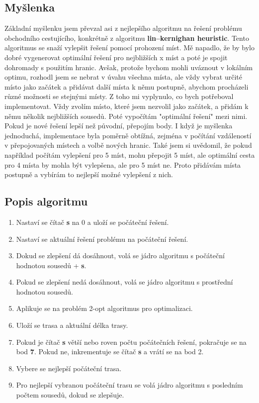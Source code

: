 \subsection{Myšlenka}
Základní myšlenku jsem převzal asi z nejlepšího algoritmu na řešení problému obchodního cestujícího, konkrétně z algoritmu \textbf{lin–kernighan heuristic}. Tento algoritmus se snaží vylepšit řešení pomocí prohození míst. Mě napadlo, že by bylo dobré vygenerovat optimální řešení pro nejbližších x míst a poté je spojit dohromady s použitím hranic. Avšak, protože bychom mohli uváznout v lokálním optimu, rozhodl jsem se nebrat v úvahu všechna místa, ale vždy vybrat určité místo jako začátek a přidávat další místa k němu postupně, abychom procházeli různé možnosti se stejnými místy. Z toho mi vyplynulo, co bych potřeboval implementovat. Vždy zvolím místo, které jsem nezvolil jako začátek, a přidám k němu několik nejbližších sousedů. Poté vypočítám "optimální řešení" mezi nimi. Pokud je nové řešení lepší než původní, přepojím body. I když je myšlenka jednoduchá, implementace byla poměrně obtížná, zejména v počítání vzdáleností v přepojovaných místech a volbě nových hranic. Také jsem si uvědomil, že pokud například počítám vylepšení pro 5 míst, mohu přepojit 5 míst, ale optimální cesta pro 4 místa by mohla být vylepšena, ale pro 5 míst ne. Proto přidávám místa postupně a vybírám to nejlepší možné vylepšení z nich.

\subsection{Popis algoritmu}
\begin{enumerate}
\item Nastaví se čítač \textbf{s} na 0 a uloží se počáteční řešení.
\item Nastaví se aktuální řešení problému na počáteční řešení.
\item Dokud se zlepšení dá dosáhnout, volá se jádro algoritmu s počáteční hodnotou sousedů + \textbf{s}.
\item Pokud se zlepšení nedá dosáhnout, volá se jádro algoritmu s prostřední hodnotou sousedů.
\item Aplikuje se na problém 2-opt algoritmus pro optimalizaci.
\item Uloží se trasa a aktuální délka trasy.
\item Pokud je čítač \textbf{s} větší nebo roven počtu počátečních řešení, pokračuje se na bod \textbf{7}. Pokud ne, inkrementuje se čítač \textbf{s} a vrátí se na bod 2.
\item Vybere se nejlepší počáteční trasa.
\item Pro nejlepší vybranou počáteční trasu se volá jádro algoritmu s posledním počtem sousedů, dokud se zlepšuje.
\end{enumerate}


